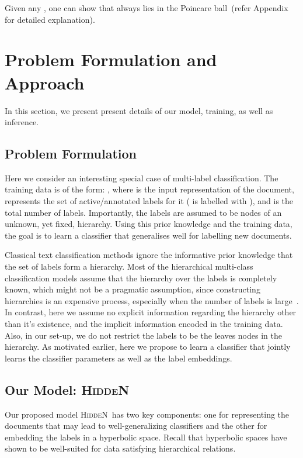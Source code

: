 \documentclass[11pt,a4paper]{article}
\newcommand{\model}{\mbox{\textsc{HiddeN}}}
\begin{document}
Given any , one can show that  always lies in the Poincare ball~(refer Appendix for detailed explanation).

\section{Problem Formulation and Approach}
In this section, we present present details of our model, training, as well as inference.

\subsection{Problem Formulation \label{sec:probformulation}} 
Here we consider an interesting special case of multi-label classification. The training data is of the form: , where  is the input representation of the  document,  represents the set of active/annotated labels for it ( is labelled with ), and  is the total number of labels. Importantly, the labels are assumed to be nodes of an unknown, yet fixed, hierarchy.  Using this prior knowledge and the training data, the goal is to learn a classifier that generalises well for labelling new documents.

Classical text classification methods ignore the informative prior knowledge that the set of labels form a hierarchy. Most of the hierarchical multi-class classification models assume that the hierarchy over the labels is completely known, which might not be a pragmatic assumption, since constructing hierarchies is an expensive process, especially when the number of labels is large~\cite{extreme}.  In contrast, here we assume no explicit information regarding the hierarchy other than it's existence, and the implicit information encoded in the training data. Also, in our set-up, we do not restrict the labels to be the leaves nodes in the hierarchy. As motivated earlier, here we propose to learn a classifier that jointly learns the classifier parameters as well as the label embeddings.

\subsection{Our Model: \model}
Our proposed model \model\ has two key components: one for representing the documents that may lead to well-generalizing classifiers and the other for embedding the labels in a hyperbolic space. Recall that hyperbolic spaces have shown to be well-suited for data satisfying hierarchical relations.
\end{document}
